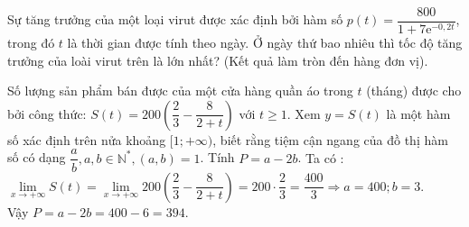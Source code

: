 \begin{bt}%
	Sự tăng trưởng của một loại virut được xác định bởi hàm số $p(t)=\dfrac{800}{1+7\mathrm{e}^{-0{,}2t}}$, trong đó $t$ là thời gian được tính theo ngày. Ở ngày thứ bao nhiêu thì tốc độ tăng trưởng của loài virut trên là lớn nhất? (Kết quả làm tròn đến hàng đơn vị).
\end{bt}

\begin{bt}%
	Số lượng sản phẩm bán được của một cửa hàng quần áo trong $t$ (tháng) được cho bởi công thức: $S(t)=200\left(\dfrac{2}{3}-\dfrac{8}{2+t}\right)$ với $t \geq 1$. Xem $y=S(t)$ là một hàm số xác định trên nửa khoảng $[1 ;+\infty)$, biết rằng tiệm cận ngang của đồ thị hàm số có dạng $\dfrac{a}{b}, a, b \in \mathbb{N}^*,(a, b)=1$. Tính $P=a-2 b$.
	\loigiai
	{Ta có : $\lim\limits _{x \rightarrow+\infty} S(t)=\lim\limits _{x \rightarrow+\infty} 200\left(\dfrac{2}{3}-\dfrac{8}{2+t}\right)=200 \cdot \dfrac{2}{3}=\dfrac{400}{3} \Rightarrow a=400 ; b=3$.\\
		Vậy $P=a-2 b=400-6=394$.
	}
\end{bt}

